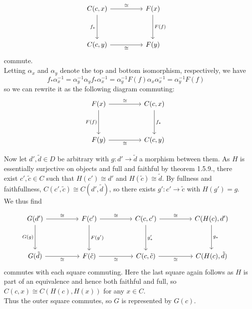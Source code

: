 \documentclass[a4paper]{article}
\begin{document}
\[\begin{tikzcd}
	{C(c,x)} && {F(x)} \\
	\\
	{C(c,y)} && {F(y)}
	\arrow["{f_*}"', from=1-1, to=3-1]
	\arrow["{F(f)}", from=1-3, to=3-3]
	\arrow["\cong", from=1-1, to=1-3]
	\arrow["\cong"', from=3-1, to=3-3]
\end{tikzcd}\]
commute.\\
Letting $\alpha_x$ and $\alpha_y$ denote the top and bottom isomorphism,
respectively, we have
 \[
f_* \alpha_x^{-1} =
\alpha_y^{-1} \alpha_y f_* \alpha_x^{-1}
= \alpha_y^{-1} F(f) \alpha_x \alpha_x^{-1}
= \alpha_y^{-1}F(f)
\] 
so we can rewrite it as the following diagram commuting:
\[\begin{tikzcd}
	{F(x)} && {C(c,x)} \\
	\\
	{F(y)} && {C(c,y)}
	\arrow["{f_*}", from=1-3, to=3-3]
	\arrow["{F(f)}"', from=1-1, to=3-1]
	\arrow["\cong", from=1-1, to=1-3]
	\arrow["\cong"', from=3-1, to=3-3]
\end{tikzcd}\]

Now let $d',\tilde{d} \in D$ be arbitrary with $g  \colon d' \to \tilde{d}$ a morphism between
them. As $H$ is essentially surjective on objects and full and faithful by
theorem 1.5.9., there exist $c', \tilde{c} \in C$ such that
$H(c') \cong d'$ and $H(\tilde{c}) \cong \tilde{d}$. By fullness and
faithfullness, $C(c', \tilde{c}) \cong C\left( d', \tilde{d} \right) $, so
there exists $g'  \colon c' \to \tilde{c}$ with
$H(g') = g$.  We thus find

\[\begin{tikzcd}
	{G(d')} && {F(c')} && {C(c,c')} && {C(H(c),d')} \\
	\\
	{G(\tilde{d})} && {F(\tilde{c})} && {C(c,\tilde{c})} && {C(H(c),\tilde{d})}
	\arrow["{G(g)}"', from=1-1, to=3-1]
	\arrow["{F(g')}", from=1-3, to=3-3]
	\arrow["\cong", from=1-1, to=1-3]
	\arrow["\cong"', from=3-1, to=3-3]
	\arrow["{g'_*}", from=1-5, to=3-5]
	\arrow["\cong", from=1-3, to=1-5]
	\arrow["\cong"', from=3-3, to=3-5]
	\arrow["{g_*}", from=1-7, to=3-7]
	\arrow["\cong", from=1-5, to=1-7]
	\arrow["\cong"', from=3-5, to=3-7]
\end{tikzcd}\]
commutes with each square commuting. Here the last square
again follows as $H$ is part of an equivalence and hence both
faithful and full, so
$C(c,x) \cong C(H(c), H(x))$ for any $x \in C$.\\

Thus the outer square commutes, so
$G$ is represented by $G(c)$.
\end{document}

